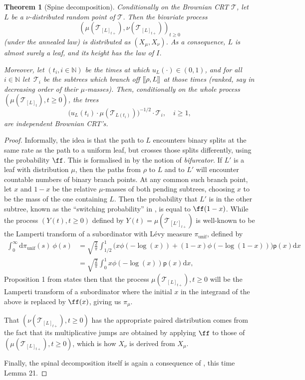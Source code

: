 \documentclass[11pt]{article}
\newcommand{\pp}{\mathsf{p}}
\newcommand{\N}{\mathbb{N}}
\newcommand{\T}{\mathcal{T}}\let\CRT\T\let\tbr\T
\def\llbracket{[\hspace{-.10em} [ }
\def\rrbracket{ ] \hspace{-.10em}]}
\newcommand{\dd}{\mathrm{d}}
\newtheorem{thm}{Theorem}[section]
\theoremstyle{definition}
\begin{document}
\begin{thm}[Spine decomposition]\label{thm:spinedec} Conditionally on the Brownian CRT $ \mathcal{T}$, let~$L$ be a $\nu$-distributed random point of $\tbr$. Then the bivariate process
\[
(\mu(\T_{[L]_{t+}}),\nu(\T_{[L]_{t+}}))_{t\geq 0}
\]
(under the annealed law) is distributed as $(X_{\mu},X_{\nu})$.
As a consequence, $L$ is almost surely a leaf, and its height has the law of $I$.

Moreover, let $(t_i,i\in\N)$ be the times at which $u_L(\cdot) \in (0,1)$, and for all $i\in \N$ let~$\T_i$ be the subtrees which branch off $\llbracket \rho,L\rrbracket$ at those times (ranked, say in decreasing order of their $\mu$-masses). Then, conditionally on the whole process $(\mu(\T_{[L]_{t}}),t\geq 0)$, the trees
\[
\big(u_L(t_i) \cdot \mu(\T_{L(t_i)}) \big)^{-1/2} \cdot \T_i, \quad i \geq 1,
\]
are independent Brownian CRT's.
\end{thm}

\begin{proof}
Informally, the idea is that the path to $L$ encounters binary splits at the same rate as the path to a uniform leaf, but crosses those splits differently, using the probability $\ff$. This is formalised in \cite{PitmanWinkel2013} by the notion of \emph{bifurcator}. If $L'$ is a leaf with distribution $\mu$, then the paths from $\rho$ to $L$ and to $L'$ will encounter countable numbers of binary branch points. At any common such branch point, let $x$ and $1-x$ be the relative $\mu$-masses of both pending subtrees, choosing $x$ to be the mass of the one containing $L$. Then the probability that $L'$ is in the other subtree, known as the ``switching probability'' in \cite{PitmanWinkel2013}, is equal to $\ff(1-x)$. While the process $(Y(t),t\geq 0)$ defined by $Y(t)=\mu(\T_{[L']_{t+}})$ is well-known \cite[\S 4]{bertoin2002self} to be the Lamperti transform of a subordinator with Lévy measure $\pi_{\mathrm{unif}}$, defined by
\begin{align*}
\int_{0}^{\infty} \mathrm{d} \pi_{\mathrm{unif}}(s) \ \phi(s) &= \sqrt{\frac{2}{\pi}} \int_{1/2}^{1} \bigl(x \phi(-\log (x)) + (1-x) \phi(-\log (1-x))\bigr)\pp(x)\dd x \\
&= \sqrt{\frac{2}{\pi}} \int_0^{1} x \phi(-\log (x))\pp(x)\dd x,
\end{align*}
Proposition 1 from \cite{PitmanWinkel2013} states then that the process $\mu(\T_{[L]_{t+}}),t\geq 0$ will be the Lamperti transform of a subordinator where the initial $x$ in the integrand of the above is replaced by $\ff(x)$, giving us $\pi_\mu$.

That $(\nu(\T_{[L]_{t+}}),t\geq 0)$ has the appropriate paired distribution comes from the fact that its multiplicative jumps are obtained by applying $\ff$ to those of $(\mu(\T_{[L]_{t+}}),t\geq 0)$, which is how $X_{\nu}$ is derived from $X_{\mu}$.

Finally, the spinal decomposition itself is again a consequence of \cite{PitmanWinkel2013}, this time Lemma 21.
\end{proof}
\end{document}
